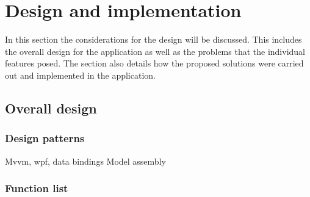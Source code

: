 \section{Design and implementation}
In this section the considerations for the design will be discussed. This
includes the overall design for the application as well as the problems that the
individual features posed. The section also details how the proposed solutions
were carried out and implemented in the application.

\subsection{Overall design}
\subsubsection{Design patterns}
Mvvm, wpf, data bindings
Model assembly

\subsubsection{Function list}

